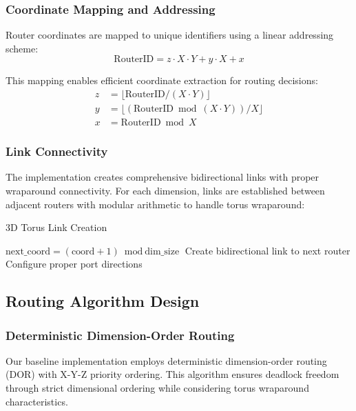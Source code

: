\documentclass[a4paper,12pt]{article}
\begin{document}
\subsubsection{Coordinate Mapping and Addressing}
Router coordinates are mapped to unique identifiers using a linear addressing scheme:
\begin{equation}
\text{RouterID} = z \cdot X \cdot Y + y \cdot X + x
\end{equation}

This mapping enables efficient coordinate extraction for routing decisions:
\begin{align}
z &= \lfloor \text{RouterID} / (X \cdot Y) \rfloor \\
y &= \lfloor (\text{RouterID} \bmod (X \cdot Y)) / X \rfloor \\
x &= \text{RouterID} \bmod X
\end{align}

\subsubsection{Link Connectivity}
The implementation creates comprehensive bidirectional links with proper wraparound connectivity. For each dimension, links are established between adjacent routers with modular arithmetic to handle torus wraparound:

\begin{algorithm}
\caption{3D Torus Link Creation}
\begin{algorithmic}[1]
        \State $\text{next\_coord} = (\text{coord} + 1) \bmod \text{dim\_size}$
        \State Create bidirectional link to next router
        \State Configure proper port directions
    \EndFor
\EndFor
\end{algorithmic}
\end{algorithm}

\subsection{Routing Algorithm Design}

\subsubsection{Deterministic Dimension-Order Routing}
Our baseline implementation employs deterministic dimension-order routing (DOR) with X-Y-Z priority ordering. This algorithm ensures deadlock freedom through strict dimensional ordering while considering torus wraparound characteristics.
\end{document}

